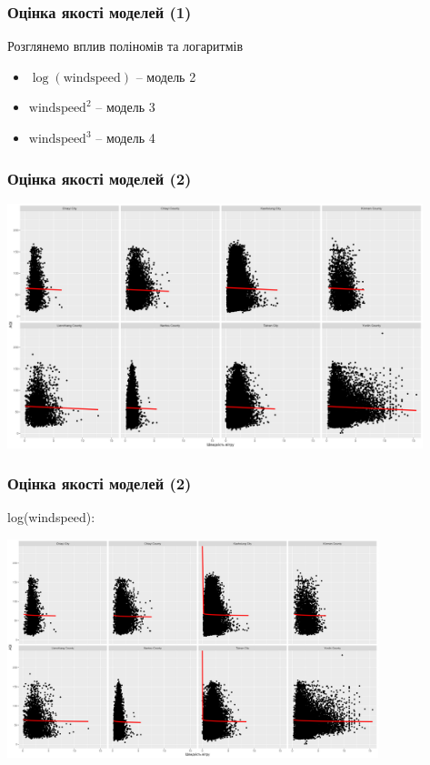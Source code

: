 ﻿\documentclass{beamer}
\begin{document}
\begin{frame}
  \frametitle{Оцінка якості моделей (1)}
  
  Розглянемо вплив поліномів та логаритмів

  \begin{itemize}
    \item $\log(\text{windspeed})$ -- модель 2
    \item $\text{windspeed}^2$ -- модель 3
    \item $\text{windspeed}^3$ -- модель 4
  \end{itemize}
\end{frame}

\begin{frame}
  \frametitle{Оцінка якості моделей (2)}
  
  \includegraphics[height=2.8in]{plots/lab3/windspeed-aqi.png}
\end{frame}

\begin{frame}
  \frametitle{Оцінка якості моделей (2)}

  log(windspeed):
  
  \includegraphics[height=2.5in]{plots/lab3/log(windspeed)-aqi.png}
\end{frame}
\end{document}
